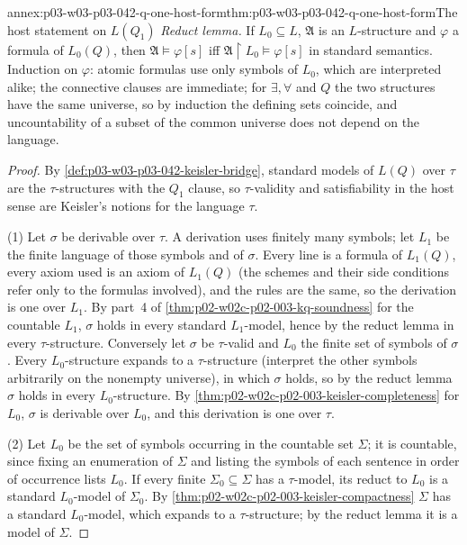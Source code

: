 \begin{annexitem}{annex:p03-w03-p03-042-q-one-host-form}{thm:p03-w03-p03-042-q-one-host-form}{The host statement on \(L(Q_1)\)}
\emph{Reduct lemma.}  If \(L_0\subseteq L\), \(\mathfrak A\) is an
\(L\)-structure and \(\varphi\) a formula of \(L_0(Q)\), then
\(\mathfrak A\models\varphi[s]\) iff \(\mathfrak A{\restriction}L_0\models
\varphi[s]\) in standard semantics.  Induction on \(\varphi\): atomic
formulas use only symbols of \(L_0\), which are interpreted alike; the
connective clauses are immediate; for \(\exists,\forall\) and \(Q\) the
two structures have the same universe, so by induction the defining sets
coincide, and uncountability of a subset of the common universe does not
depend on the language.
\begin{proof}
By \cref{def:p03-w03-p03-042-keisler-bridge}, standard models of
\(L(Q)\) over \(\tau\) are the \(\tau\)-structures with the \(Q_1\) clause,
so \(\tau\)-validity and satisfiability in the host sense are Keisler's
notions for the language \(\tau\).

(1) Let \(\sigma\) be derivable over \(\tau\).  A derivation uses finitely
many symbols; let \(L_1\) be the finite language of those symbols and of
\(\sigma\).  Every line is a formula of \(L_1(Q)\), every axiom used is an
axiom of \(L_1(Q)\) (the schemes and their side conditions refer only to
the formulas involved), and the rules are the same, so the derivation is
one over \(L_1\).  By part~4 of \cref{thm:p02-w02c-p02-003-kq-soundness}
for the countable \(L_1\), \(\sigma\) holds in every standard
\(L_1\)-model, hence by the reduct lemma in every \(\tau\)-structure.
Conversely let \(\sigma\) be \(\tau\)-valid and \(L_0\) the finite set of
symbols of \(\sigma\).  Every \(L_0\)-structure expands to a
\(\tau\)-structure (interpret the other symbols arbitrarily on the
nonempty universe), in which \(\sigma\) holds, so by the reduct lemma
\(\sigma\) holds in every \(L_0\)-structure.  By
\cref{thm:p02-w02c-p02-003-keisler-completeness} for \(L_0\), \(\sigma\)
is derivable over \(L_0\), and this derivation is one over \(\tau\).

(2) Let \(L_0\) be the set of symbols occurring in the countable set
\(\Sigma\); it is countable, since fixing an enumeration of \(\Sigma\) and listing
the symbols of each sentence in order of occurrence lists \(L_0\).  If every finite \(\Sigma_0\subseteq\Sigma\)
has a \(\tau\)-model, its reduct to \(L_0\) is a standard \(L_0\)-model
of \(\Sigma_0\).  By \cref{thm:p02-w02c-p02-003-keisler-compactness}
\(\Sigma\) has a standard \(L_0\)-model, which expands to a
\(\tau\)-structure; by the reduct lemma it is a model of \(\Sigma\).


\end{proof}
\end{annexitem}
